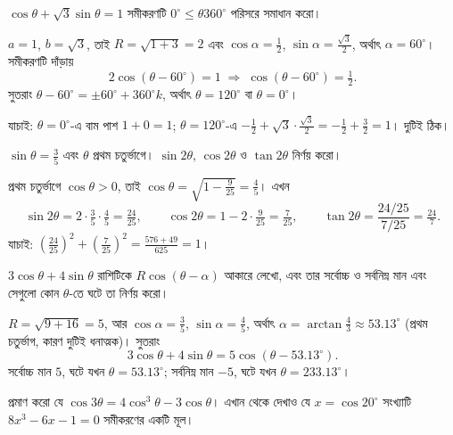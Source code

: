 \documentclass[11pt]{article}
\begin{document}
\begin{example}
$\cos\theta + \sqrt{3}\sin\theta = 1$ সমীকরণটি $0^{\circ} \leq \theta
360^{\circ}$ পরিসরে সমাধান করো।
\end{example}

\begin{solbox}
$a = 1$, $b = \sqrt{3}$, তাই $R = \sqrt{1+3} = 2$ এবং
$\cos\alpha = \tfrac{1}{2}$, $\sin\alpha = \tfrac{\sqrt{3}}{2}$, অর্থাৎ
$\alpha = 60^{\circ}$। সমীকরণটি দাঁড়ায়
\[
  2\cos\left( \theta - 60^{\circ} \right) = 1
  \;\Longrightarrow\; \cos\left( \theta - 60^{\circ} \right) = \tfrac{1}{2} .
\]
সুতরাং $\theta - 60^{\circ} = \pm 60^{\circ} + 360^{\circ}k$, অর্থাৎ
$\theta = 120^{\circ}$ বা $\theta = 0^{\circ}$।

যাচাই: $\theta = 0^{\circ}$-এ বাম পাশ $1 + 0 = 1$; $\theta = 120^{\circ}$-এ
$-\tfrac{1}{2} + \sqrt{3}\cdot\tfrac{\sqrt{3}}{2} = -\tfrac{1}{2} + \tfrac{3}{2}
= 1$। দুটিই ঠিক।
\end{solbox}

 $\sin\theta = \tfrac{3}{5}$ এবং $\theta$ প্রথম চতুর্ভাগে। $\sin 2\theta$,
$\cos 2\theta$ ও $\tan 2\theta$ নির্ণয় করো।

\begin{sol}
প্রথম চতুর্ভাগে $\cos\theta > 0$, তাই
$\cos\theta = \sqrt{1 - \tfrac{9}{25}} = \tfrac{4}{5}$। এখন
\[
  \sin 2\theta = 2 \cdot \tfrac{3}{5} \cdot \tfrac{4}{5} = \tfrac{24}{25},
  \qquad
  \cos 2\theta = 1 - 2 \cdot \tfrac{9}{25} = \tfrac{7}{25},
  \qquad
  \tan 2\theta = \frac{24/25}{7/25} = \tfrac{24}{7} .
\]
যাচাই: $\left( \tfrac{24}{25} \right)^{2} + \left( \tfrac{7}{25} \right)^{2}
= \tfrac{576+49}{625} = 1$।
\end{sol}

 $3\cos\theta + 4\sin\theta$ রাশিটিকে $R\cos(\theta-\alpha)$ আকারে
লেখো, এবং তার সর্বোচ্চ ও সর্বনিম্ন মান এবং সেগুলো কোন $\theta$-তে ঘটে তা নির্ণয়
করো।

\begin{sol}
$R = \sqrt{9+16} = 5$, আর $\cos\alpha = \tfrac{3}{5}$, $\sin\alpha =
\tfrac{4}{5}$, অর্থাৎ $\alpha = \arctan\tfrac{4}{3} \approx 53.13^{\circ}$
(প্রথম চতুর্ভাগ, কারণ দুটিই ধনাত্মক)। সুতরাং
\[
  3\cos\theta + 4\sin\theta = 5\cos(\theta - 53.13^{\circ}) .
\]
সর্বোচ্চ মান $5$, ঘটে যখন $\theta = 53.13^{\circ}$; সর্বনিম্ন মান $-5$, ঘটে
যখন $\theta = 233.13^{\circ}$।
\end{sol}

 প্রমাণ করো যে $\cos 3\theta = 4\cos^{3}\theta - 3\cos\theta$। এখান
থেকে দেখাও যে $x = \cos 20^{\circ}$ সংখ্যাটি $8x^{3} - 6x - 1 = 0$ সমীকরণের
একটি মূল।
\end{document}
